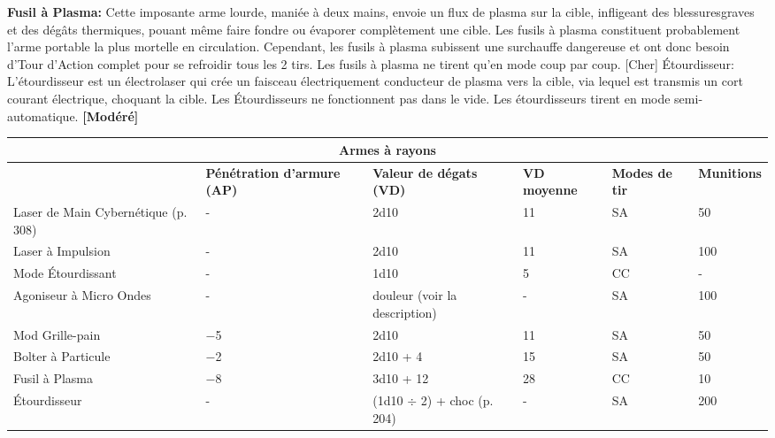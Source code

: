 \textbf{Fusil à Plasma:} Cette imposante arme lourde, maniée à deux mains, envoie un flux de plasma sur la cible, infligeant des blessuresgraves et des dégâts thermiques, pouant même faire fondre ou évaporer complètement une cible. Les fusils à plasma constituent probablement l'arme portable la plus mortelle en circulation. Cependant, les fusils à plasma subissent une surchauffe dangereuse et ont donc besoin d'Tour d'Action complet pour se refroidir tous les 2 tirs. Les fusils à plasma ne tirent qu'en mode coup par coup. [Cher] Étourdisseur: L'étourdisseur est un électrolaser qui crée un faisceau électriquement conducteur de plasma vers la cible, via lequel est transmis un cort courant électrique, choquant la cible. Les Étourdisseurs ne fonctionnent pas dans le vide. Les étourdisseurs tirent en mode semi-automatique. \textbf{[Modéré]} 

\begin{table} \begin{tabularx}{\textwidth}{|X|X|X|X|l|l|} \hline

\multicolumn{6}{|c|}{\textbf{Armes à rayons}} \\ \hline

&\textbf{Pénétration d'armure (AP)}	&\textbf{Valeur de dégats (VD)}	&\textbf{VD moyenne}	&\textbf{Modes de tir}	&\textbf{Munitions} \\ \hline

Laser de Main Cybernétique (p. 308)	&- &2d10	&11	&SA	&50 \\ \hline

Laser à Impulsion	&- &2d10	&11	&SA	&100 \\ \hline

Mode Étourdissant	&- &1d10	&5	&CC	&- \\ \hline

Agoniseur à Micro Ondes	&- &douleur (voir la description)	&- &SA	&100 \\ \hline

Mod Grille-pain	&$-$5	&2d10	&11	&SA	&50 \\ \hline

Bolter à Particule	&$-$2	&2d10 + 4	&15	&SA	&50 \\ \hline

Fusil à Plasma	&$-$8	&3d10 + 12	&28	&CC	&10 \\ \hline

Étourdisseur	&- &(1d10 $\div$ 2) + choc (p. 204)	&- &SA	&200 \\ \hline

\end{tabularx} \label{tab:beam-weapons} \end{table} 



